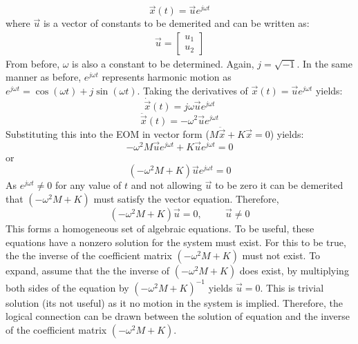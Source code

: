 \documentclass[12pt,letter]{article}
\numberwithin{ex}{section} %
\numberwithin{re}{section} %
\begin{document}
\begin{equation}
	\vec{x}(t) = \vec{u}e^{j\omega t}
\end{equation}
where $\vec{u}$ is a vector of constants to be demerited and can be written as:
\begin{eqnarray}
\vec{u}=  \begin{bmatrix} u_1 \\  u_2 \end{bmatrix}
\end{eqnarray}
From before, $\omega$ is also a constant to be determined. Again, $j=\sqrt{-1}$. In the same manner as before, $e^{j\omega t}$ represents harmonic motion as $e^{j\omega t} = \cos(\omega t) + j \sin(\omega t)$. Taking the derivatives of $\vec{x}(t) = \vec{u}e^{j\omega t}$ yields:
\begin{equation}
	\dot{\vec{x}}(t) = j\omega\vec{u}e^{j\omega t}
\end{equation}
\begin{equation}
	\ddot{\vec{x}}(t) = -\omega^2\vec{u}e^{j\omega t}
\end{equation}
Substituting this into the EOM in vector form ($M\ddot{\vec{x}} + K\vec{x} =0$) yields:
\begin{equation}
-\omega^2 M  \vec{u}e^{j\omega t} + K\vec{u}e^{j\omega t} =0
\end{equation}
or 
\begin{equation}
(-\omega^2 M  + K)\vec{u}e^{j\omega t} =0
\end{equation}
As $e^{j\omega t} \neq 0$ for any value of $t$ and not allowing $\vec{u}$ to be zero it can be demerited that $(-\omega^2 M  + K)$ must satisfy the vector equation. Therefore,
\begin{equation}
(-\omega^2 M  + K)\vec{u} =0, \hspace{1cm} \vec{u}\neq0
\end{equation}
This forms a homogeneous set of algebraic equations. To be useful, these equations have a nonzero solution for the system must exist. For this to be true, the the inverse of the coefficient matrix $(-\omega^2 M  + K)$ must not exist. To expand, assume that the the inverse of $(-\omega^2 M  + K)$ does exist, by multiplying both sides of the equation by $(-\omega^2 M  + K)^{-1}$ yields $\vec{u}=0$. This is trivial solution (its not useful) as it no motion in the system is implied. Therefore, the logical connection can be drawn between the  solution of equation and the inverse of the coefficient matrix $(-\omega^2 M  + K)$.
\end{document}
